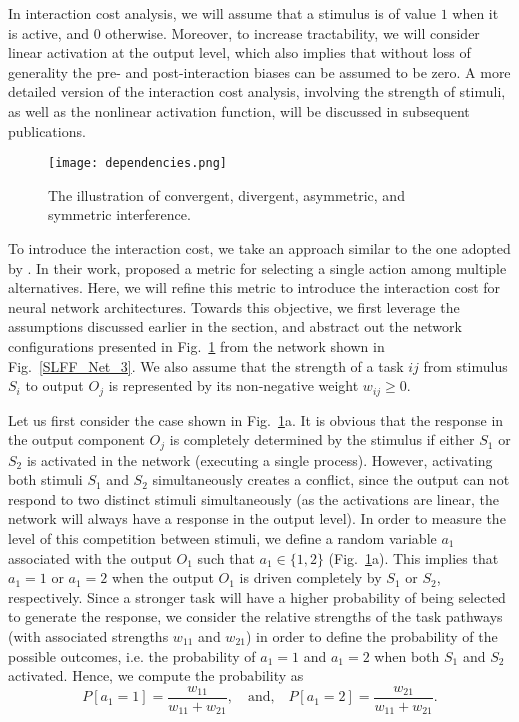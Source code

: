 \documentclass[10pt,letterpaper]{article}
\begin{document}
In interaction cost analysis, we will assume that a stimulus is of value $1$ when it is active, and $0$ otherwise. Moreover, to increase tractability, we will consider linear activation at the output level, which also implies that without loss of generality the pre- and post-interaction biases can be assumed to be zero. A more detailed version of the interaction cost analysis, involving the strength of stimuli, as well as the nonlinear activation function, will be discussed in subsequent publications.
%
%
\begin{figure}[t]
\begin{center}
  \texttt{[image: dependencies.png]}
  \caption{\small{The illustration of convergent, divergent, asymmetric, and symmetric interference.}}
  \label{indirect}
\end{center}
\vspace{-2.0em}
\end{figure}
%

To introduce the interaction cost, we take an approach similar to the one adopted by . In their work,  proposed a metric for selecting a single action among multiple alternatives. Here, we will refine this metric to introduce the interaction cost for neural network architectures. Towards this objective, we first leverage the assumptions discussed earlier in the section, and abstract out the network configurations presented in Fig.~\ref{indirect} from the network shown in Fig.~\ref{SLFF_Net_3}. We also assume that the strength of a task $ij$ from stimulus $S_i$ to output $O_j$ is represented by its non-negative weight $w_{ij} \geq 0$. 

Let us first consider the case shown in Fig.~\ref{indirect}a. It is obvious that the response in the output component $O_j$ is completely determined by the stimulus if either $S_1$ or $S_2$ is activated in the network (executing a single process). However, activating both stimuli $S_1$ and $S_2$ simultaneously creates a conflict, since the output can not respond to two distinct stimuli simultaneously (as the activations are linear, the network will always have a response in the output level). In order to measure the level of this competition between stimuli, we define a random variable $a_1$ associated with the output $O_1$ such that $a_1 \in \{1,2\}$ (Fig.~\ref{indirect}a). This implies that $a_1=1$ or $a_1=2$ when the output $O_1$ is driven completely by $S_1$ or $S_2$, respectively. Since a stronger task will have a higher probability of being selected to generate the response, we consider the relative strengths of the task pathways (with associated strengths $w_{11}$ and $w_{21}$) in order to define the probability of the possible outcomes, i.e. the probability of $a_1=1$ and $a_1=2$ when both $S_1$ and $S_2$ activated. Hence, we compute the probability as
\begin{displaymath}
P[a_1=1] = \frac{w_{11}}{w_{11}+w_{21}},
\quad \textrm{and,} \quad
P[a_1=2] = \frac{w_{21}}{w_{11}+w_{21}}.
\end{displaymath} 
\end{document}
